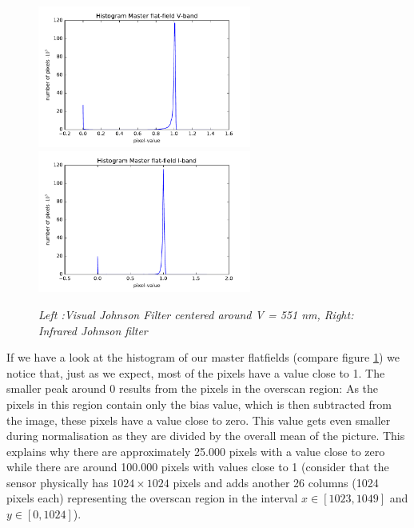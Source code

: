 \begin{figure}[h]
	\includegraphics[width=70mm]{histogram_V}
	\includegraphics[width=70mm]{histogram_I}
	\centering
	\caption{ \itshape Left :Visual Johnson Filter centered around V = 551 nm, Right:  Infrared Johnson filter }
	\label{fig:Abbildung 4}
\end{figure}
\noindent
If we have a look at the histogram of our master flatfields (compare figure \ref{fig:Abbildung 4}) we notice that, just as we expect, most of the pixels have a value close to 1. The smaller peak around 0 results from the pixels in the overscan region: As the pixels in this region contain only the bias value, which is then subtracted from the image, these pixels have a value close to zero. This value gets even smaller during normalisation as they are divided by the overall mean of the picture. This explains why there are approximately 25.000 pixels with a value close to zero while there are around 100.000 pixels with values close to 1 (consider that the sensor physically has $1024 \times 1024$ pixels and adds another 26 columns (1024 pixels each) representing the overscan region in the interval $x\in \left[1023,1049\right]$ and $y\in \left[0,1024\right]$). 



